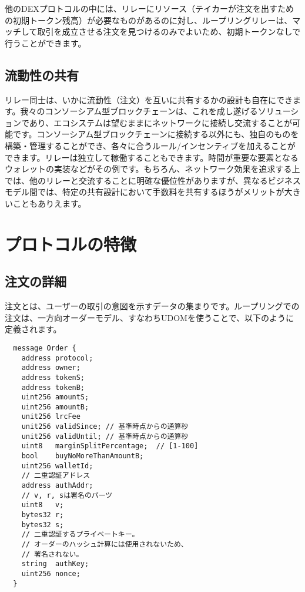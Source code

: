 \documentclass{article}
\begin{document}
\begin{multicols}{2}
他のDEXプロトコルの中には、リレーにリソース（テイカーが注文を出すための初期トークン残高）が必要なものがあるのに対し、ループリングリレーは、マッチして取引を成立させる注文を見つけるのみでよいため、初期トークンなしで行うことができます。

\subsection{流動性の共有\label{sec:liquidity_sharing}}
リレー同士は、いかに流動性（注文）を互いに共有するかの設計も自在にできます。我々のコンソーシアム型ブロックチェーンは、これを成し遂げるソリューションであり、エコシステムは望むままにネットワークに接続し交流することが可能です。コンソーシアム型ブロックチェーンに接続する以外にも、独自のものを構築・管理することができ、各々に合うルール/インセンティブを加えることができます。リレーは独立して稼働することもできます。時間が重要な要素となるウォレットの実装などがその例です。もちろん、ネットワーク効果を追求する上では、他のリレーと交流することに明確な優位性がありますが、異なるビジネスモデル間では、特定の共有設計において手数料を共有するほうがメリットが大きいこともありえます。


\section{プロトコルの特徴\label{sec:protocol}}

\subsection{注文の詳細\label{anatomy}}
注文とは、ユーザーの取引の意図を示すデータの集まりです。ループリングでの注文は、一方向オーダーモデル、すなわちUDOMを使うことで、以下のように定義されます。

\begin{verbatim}
  message Order {
    address protocol;
    address owner;
    address tokenS;
    address tokenB;
    uint256 amountS;
    uint256 amountB;
    unit256 lrcFee
    unit256 validSince; // 基準時点からの通算秒
    unit256 validUntil; // 基準時点からの通算秒
    uint8   marginSplitPercentage;  // [1-100]
    bool    buyNoMoreThanAmountB;
    uint256 walletId;
    // 二重認証アドレス
    address authAddr;
   	// v, r, sは署名のパーツ
    uint8   v;       
    bytes32 r;
    bytes32 s;
    // 二重認証するプライベートキー。
    // オーダーのハッシュ計算には使用されないため、
    // 署名されない。
    string  authKey;          
    uint256 nonce;
  }
\end{verbatim}



\end{multicols}
\end{document}
